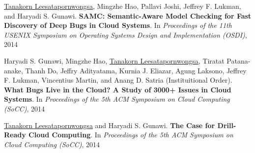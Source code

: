 \documentclass[10pt]{article} %
\begin{document}

\underline{Tanakorn Leesatapornwongsa}, Mingzhe Hao, Pallavi Joshi, Jeffrey F.
Lukman, and Haryadi S. Gunawi. \textbf{SAMC: Semantic-Aware Model Checking for
Fast Discovery of Deep Bugs in Cloud Systems}. In \textit{Proceedings of the
11th USENIX Symposium on Operating Systems Design and Implementation (OSDI)},
2014
\vspace{2mm}

\newpage

Haryadi S. Gunawi, Mingzhe Hao, \underline{Tanakorn Leesatapornwongsa}, Tiratat
Patana-anake, Thanh Do, Jeffry Adityatama, Kurnia J. Eliazar, Agung Laksono,
Jeffrey F. Lukman, Vincentius Martin, and Anang D. Satria (Instituitional Order).
\textbf{What Bugs Live in the Cloud? A Study of 3000+ Issues in Cloud Systems}.
In \textit{Proceedings of the 5th ACM Symposium on Cloud Computing (SoCC)}, 2014
\vspace{2mm}

\underline{Tanakorn Leesatapornwongsa} and Haryadi S. Gunawi. \textbf{The Case
for Drill-Ready Cloud Computing}. In \textit{Proceedings of the 5th ACM
Symposium on Cloud Computing (SoCC)}, 2014
\vspace{2mm}


\end{document}
